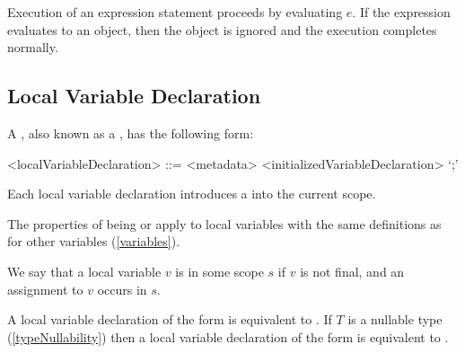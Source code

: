 \documentclass[makeidx]{article}
\begin{document}
{\LMHash{}%
Execution of an expression statement  proceeds by evaluating $e$.
If the expression evaluates to an object,
then the object is ignored and the execution completes normally.


\subsection{Local Variable Declaration}

\LMHash{}%
A ,
also known as a ,
has the following form:

\begin{grammar}
<localVariableDeclaration> ::= <metadata> <initializedVariableDeclaration> `;'
\end{grammar}

\LMHash{}%
Each local variable declaration introduces
a 
into the current scope.


\LMHash{}%
The properties of being
 or
apply to local variables with the same definitions as for other variables
(\ref{variables}).

\LMHash{}%
We say that a local variable $v$ is 
in some scope $s$
if $v$ is not final, and an assignment to $v$ occurs in $s$.

\LMHash{}%
A local variable declaration of the form  is equivalent to
.
If $T$ is a nullable type
(\ref{typeNullability})
then a local variable declaration of the form 
is equivalent to .


}
\end{document}
